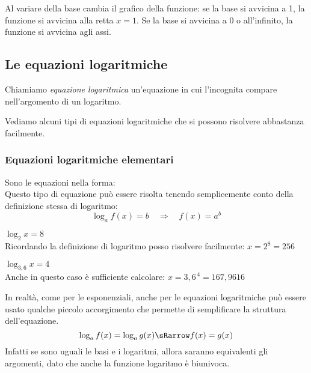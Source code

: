 \vspace{.5cm}

Al variare della base cambia il grafico della funzione: 
se la base si avvicina a 1, la funzione si avvicina 
alla retta \(x=1\). 
Se la base si avvicina a 0 o all'infinito, la funzione si avvicina agli 
assi.

\subsection{Le equazioni logaritmiche}
\label{subsec:esplog_equazionilogaritmiche}

\begin{definizione}{
Chiamiamo \emph{equazione logaritmica} un'equazione in cui l'incognita 
compare 
nell'argomento di un logaritmo.
}
\end{definizione}

Vediamo alcuni tipi di equazioni logaritmiche che si possono risolvere 
abbastanza facilmente.

\subsubsection{Equazioni logaritmiche elementari}
\label{subsubsec:esplog_eq_log_elementari}

\noindent Sono le equazioni nella forma: \quad {} 
\\[7pt]
Questo tipo di equazione può essere risolta tenendo semplicemente conto 
della definizione stessa di logaritmo:
\[\log_a{f(x)} = b \quad \Rightarrow \quad f(x)=a^b\]
\begin{esempio}
 \(\log_2{x} = 8\)\\[4pt] 
 Ricordando la definizione di logaritmo posso risolvere facilmente: \; \(x 
= 2^8 = 256\)
\end{esempio}
\begin{esempio}
 \(\log_{3,6}{x} = 4\)\\[4pt]
 Anche in questo caso è sufficiente calcolare: \quad \( x = 3,6^{\,4} = 
167,9616\)
\end{esempio}

In realtà, come per le esponenziali, anche per le equazioni logaritmiche 
può essere usato qualche piccolo
accorgimento che permette di semplificare la struttura dell'equazione.
\[\log_a{f(x)} = \log_a{g(x)} \sRarrow f(x) = g(x)\]
Infatti se sono uguali le basi e i logaritmi, allora saranno equivalenti 
gli argomenti, 
dato che anche la funzione logaritmo è biunivoca.

